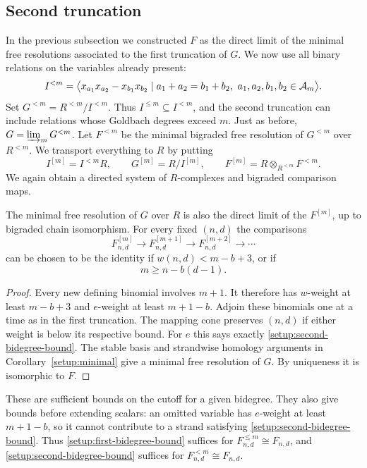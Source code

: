 \subsection{Second truncation}
In the previous subsection we constructed $F$ as the direct limit of
the minimal free resolutions associated to the first truncation of $G$.
We now use all binary relations on the variables already present:
\[
 I^{<m}=\bigl\langle x_{a_1}x_{a_2}-x_{b_1}x_{b_2}
 \mid a_1+a_2=b_1+b_2,\ a_1,a_2,b_1,b_2\in\mathcal A_m\bigr\rangle .
\]
Set $G^{<m}=R^{<m}/I^{<m}$. Thus $I^{\le m}\subseteq I^{<m}$, and the
second truncation can include relations whose Goldbach degrees exceed
$m$. Just as before, $G=\varinjlim_m G^{<m}$. Let $F^{<m}$ be the
minimal bigraded free resolution of $G^{<m}$ over $R^{<m}$. We
transport everything to $R$ by putting
\[
 I^{[m]}=I^{<m}R,\qquad G^{[m]}=R/I^{[m]},\qquad
 F^{[m]}=R\otimes_{R^{<m}}F^{<m}.
\]
We again obtain a directed system of $R$-complexes and bigraded
comparison maps.

\begin{theorem}
\label{setup:second-stabilization}
The minimal free resolution of $G$ over $R$ is also the direct limit
of the $F^{[m]}$, up to bigraded chain isomorphism. For every fixed
$(n,d)$ the comparisons
\[
 F^{[m]}_{n,d}\longrightarrow F^{[m+1]}_{n,d}
              \longrightarrow F^{[m+2]}_{n,d}\longrightarrow\cdots
\]
can be chosen to be the identity if $w(n,d)<m-b+3$, or if
\begin{equation}\label{setup:second-bidegree-bound}
 m\ge n-b(d-1).
\end{equation}
\end{theorem}
\begin{proof}
Every new defining binomial involves $m+1$. It therefore has
$w$-weight at least $m-b+3$ and $e$-weight at least $m+1-b$.
Adjoin these binomials one at a time as in the first truncation.
The mapping cone preserves $(n,d)$ if either weight is below its
respective bound. For $e$ this says exactly \eqref{setup:second-bidegree-bound}.
The stable basis and strandwise homology arguments in
Corollary~\ref{setup:minimal} give a minimal free resolution of $G$.
By uniqueness it is isomorphic to $F$.
\end{proof}

These are sufficient bounds on the cutoff for a given bidegree. They
also give bounds before extending scalars: an omitted variable has
$e$-weight at least $m+1-b$, so it cannot contribute to a strand satisfying
\eqref{setup:second-bidegree-bound}. Thus \eqref{setup:first-bidegree-bound}
suffices for $F^{\le m}_{n,d}\cong F_{n,d}$, and
\eqref{setup:second-bidegree-bound} suffices for $F^{<m}_{n,d}\cong F_{n,d}$.

